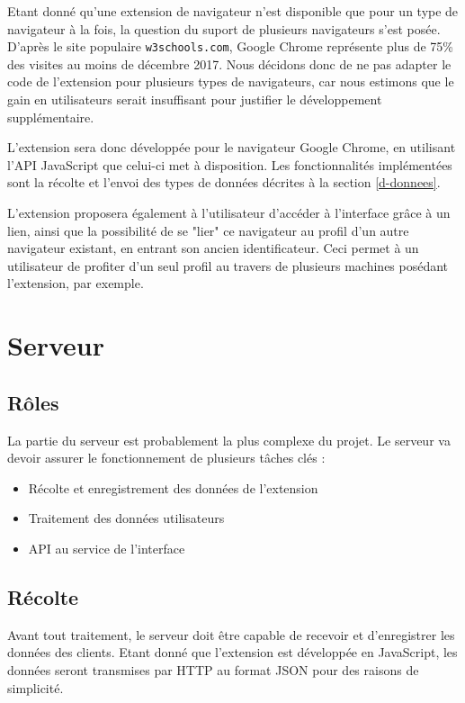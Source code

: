 	Etant donné qu'une extension de navigateur n'est disponible que pour un type de navigateur à la fois, la question du suport de plusieurs navigateurs s'est posée. D'après le site populaire \texttt{w3schools.com}\cite{browser-stats}, Google Chrome représente plus de 75\% des visites au moins de décembre 2017. Nous décidons donc de ne pas adapter le code de l'extension pour plusieurs types de navigateurs, car nous estimons que le gain en utilisateurs serait insuffisant pour justifier le développement supplémentaire.

	L'extension sera donc développée pour le navigateur Google Chrome, en utilisant l'API JavaScript que celui-ci met à disposition. Les fonctionnalités implémentées sont la récolte et l'envoi des types de données décrites à la section \ref{d-donnees}.

	L'extension proposera également à l'utilisateur d'accéder à l'interface grâce à un lien, ainsi que la possibilité de se "lier" ce navigateur au profil d'un autre navigateur existant, en entrant son ancien identificateur. Ceci permet à un utilisateur de profiter d'un seul profil au travers de plusieurs machines posédant l'extension, par exemple. 

\section{Serveur}

	\subsection{Rôles}

		La partie du serveur est probablement la plus complexe du projet. Le serveur va devoir assurer le fonctionnement de plusieurs tâches clés :

		\begin{itemize}
			\item Récolte et enregistrement des données de l'extension
			\item Traitement des données utilisateurs
			\item API au service de l'interface
		\end{itemize}

	\subsection{Récolte}

		Avant tout traitement, le serveur doit être capable de recevoir et d'enregistrer les données des clients. Etant donné que l'extension est développée en JavaScript, les données seront transmises par HTTP au format JSON pour des raisons de simplicité.

